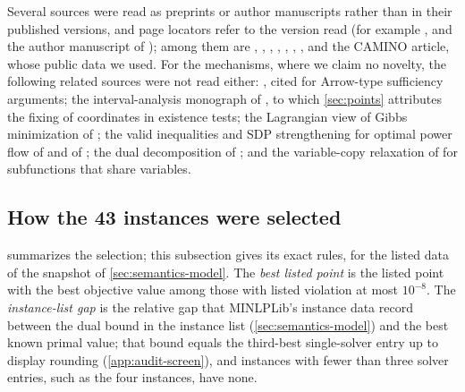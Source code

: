 Several sources were read as preprints or author manuscripts rather than in their published versions, and page locators refer to the version read (for example \citealp[slide 23, PDF p.~38]{vigerske2014-towards-minlplib-2-0}, and the author manuscript of \citealp[\S3.3, p.~23]{bestuzheva2025-global-optimization-of-mixed-integer}); among them are \citet{waki2006-sums-of-squares-and-semidefinite}, \citet{mcdonald1995-global-optimization-for-the-phase-2}, \citet{davarnia2021-strong-relaxations-for-continuous-nonlinear}, \citet{bertsimas2025-towards-a-practical-global-optimization}, \citet{schweidtmann2019-deterministic-global-optimization-with-artificial}, \citet{bingane2019-tight-and-cheap-conic-relaxations}, \citet{gleixner2012-towards-globally-optimal-operation-of}, \citet{bestuzheva2025-global-optimization-of-mixed-integer} and the CAMINO article, whose public data we used.
For the mechanisms, where we claim no novelty, the following related sources were not read either: \citet{arrow1970-public-investment-the-rate-of}, cited for Arrow-type sufficiency arguments; the interval-analysis monograph of \citet{hansen1992-global-optimization-using-interval-analysis}, to which \cref{sec:points} attributes the fixing of coordinates in existence tests; the Lagrangian view of Gibbs minimization of \citet{mitsos2007-a-dual-extremum-principle-in}; the valid inequalities and SDP strengthening for optimal power flow of \citet{kocuk2016-inexactness-of-sdp-relaxation-and,kocuk2018-matrix-minor-reformulation-and-socp} and of \citet{coffrin2017-strengthening-the-sdp-relaxation-of}; the dual decomposition of \citet{caroe1999-dual-decomposition-in-stochastic-integer}; and the variable-copy relaxation of \citet{berenguel2013-on-interval-branch-and-bound} for subfunctions that share variables.

\subsection{How the 43 instances were selected}\label{app:literature-funnel}

 summarizes the selection; this subsection gives its exact rules, for the listed data of the snapshot of \cref{sec:semantics-model}.
The \emph{best listed point} is the listed point with the best objective value among those with listed violation at most $10^{-8}$.
The \emph{instance-list gap} is the relative gap that MINLPLib's instance data record between the dual bound in the instance list (\cref{sec:semantics-model}) and the best known primal value; that bound equals the third-best single-solver entry up to display rounding (\cref{app:audit-screen}), and instances with fewer than three solver entries, such as the four  instances, have none.

